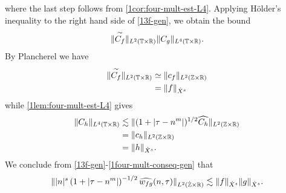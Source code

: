 %
where the last step follows from \cref{1cor:four-mult-est-L4}.
%
%
Applying H\"{o}lder's inequality to the right hand side of
\eqref{13f-gen}, we obtain the bound
%
\begin{equation}
	\label{14f-gen}
	\begin{split}
		\|\overset{\sim}{C_f} \|_{L^2(\mathbb{T} \times \mathbb{R})} \|C_g \|_{L^4\left( \mathbb{T} 
		\times \mathbb{R} 
		\right)}. 
	\end{split}
\end{equation}
%
By Plancherel we have
%
%
\begin{equation}
	\label{15f-gen}
	\begin{split}
		\|\overset{\sim}{C_f} \|_{L^2(\mathbb{T} \times \mathbb{R})}
		& \simeq \|c_f\|_{L^2(\mathbb{Z} \times \mathbb{R})}
		\\
		& = \|f \|_{\dot{X}^s}
	\end{split}
\end{equation}
%
while \cref{1lem:four-mult-est-L4} gives
%
%
\begin{equation}
	\label{1four-mult-conseq-gen}
	\begin{split}
		\|C_h\|_{L^4(\mathbb{T} \times \mathbb{R})} 
		& \lesssim \|(1 + | \tau - n^m |)^{1/2} \widehat{C_h}
		\|_{L^2(\mathbb{Z} \times \mathbb{R})}
		\\
		& = \|c_{h} \|_{L^2(\mathbb{Z} \times \mathbb{R})} 
		\\
		& = \|h \|_{\dot{X}^s}. 
	\end{split}
\end{equation}
%
%
We conclude from \eqref{13f-gen}-\eqref{1four-mult-conseq-gen} that
%
%
\begin{equation*}
	\begin{split}
		\| |n|^s \left( 1 + | \tau - n^m | \right)^{-1/2} \widehat{w_{fg}}(n, \tau) 
		 \|_{L^2(\dot{\mathbb{Z}} \times \mathbb{R})}
		 \lesssim \|f\|_{\dot{X}^s} \|g\|_{\dot{X}^s}.
	\end{split}
\end{equation*}
%
%
%
%
